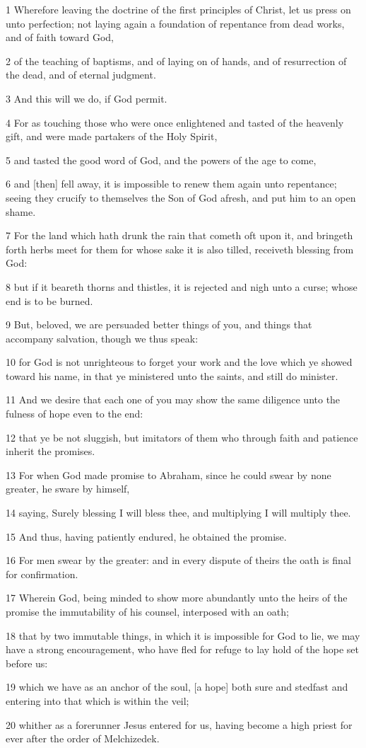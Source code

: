 \par 1 Wherefore leaving the doctrine of the first principles of Christ, let us press on unto perfection; not laying again a foundation of repentance from dead works, and of faith toward God,
\par 2 of the teaching of baptisms, and of laying on of hands, and of resurrection of the dead, and of eternal judgment.
\par 3 And this will we do, if God permit.
\par 4 For as touching those who were once enlightened and tasted of the heavenly gift, and were made partakers of the Holy Spirit,
\par 5 and tasted the good word of God, and the powers of the age to come,
\par 6 and [then] fell away, it is impossible to renew them again unto repentance; seeing they crucify to themselves the Son of God afresh, and put him to an open shame.
\par 7 For the land which hath drunk the rain that cometh oft upon it, and bringeth forth herbs meet for them for whose sake it is also tilled, receiveth blessing from God:
\par 8 but if it beareth thorns and thistles, it is rejected and nigh unto a curse; whose end is to be burned.
\par 9 But, beloved, we are persuaded better things of you, and things that accompany salvation, though we thus speak:
\par 10 for God is not unrighteous to forget your work and the love which ye showed toward his name, in that ye ministered unto the saints, and still do minister.
\par 11 And we desire that each one of you may show the same diligence unto the fulness of hope even to the end:
\par 12 that ye be not sluggish, but imitators of them who through faith and patience inherit the promises.
\par 13 For when God made promise to Abraham, since he could swear by none greater, he sware by himself,
\par 14 saying, Surely blessing I will bless thee, and multiplying I will multiply thee.
\par 15 And thus, having patiently endured, he obtained the promise.
\par 16 For men swear by the greater: and in every dispute of theirs the oath is final for confirmation.
\par 17 Wherein God, being minded to show more abundantly unto the heirs of the promise the immutability of his counsel, interposed with an oath;
\par 18 that by two immutable things, in which it is impossible for God to lie, we may have a strong encouragement, who have fled for refuge to lay hold of the hope set before us:
\par 19 which we have as an anchor of the soul, [a hope] both sure and stedfast and entering into that which is within the veil;
\par 20 whither as a forerunner Jesus entered for us, having become a high priest for ever after the order of Melchizedek.

